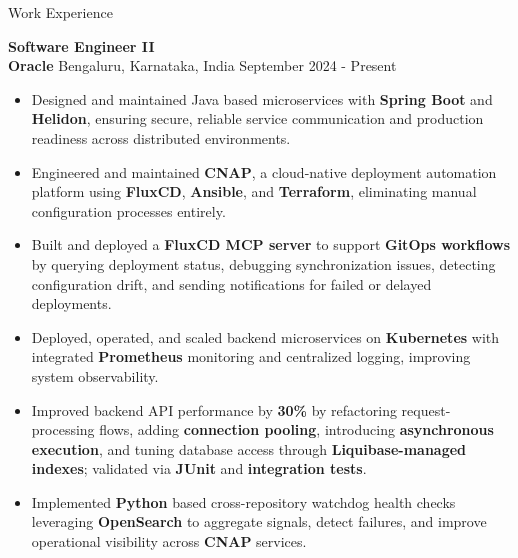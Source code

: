 \documentclass{resume}
\begin{document}
\begin{rSection}{Work Experience}

\textbf{Software Engineer II} \\
\textbf{Oracle} \textbar{} Bengaluru, Karnataka, India \hspace*{\fill} September 2024 - Present
\vspace{-2pt}
\begin{itemize}
    \item Designed and maintained Java based microservices with \textbf{Spring Boot} and \textbf{Helidon}, ensuring secure, reliable service communication and production readiness across distributed environments.
    \item Engineered and maintained \textbf{CNAP}, a cloud-native deployment automation platform using \textbf{FluxCD}, \textbf{Ansible}, and \textbf{Terraform}, eliminating manual configuration processes entirely.
    \item Built and deployed a \textbf{FluxCD MCP server} to support \textbf{GitOps workflows} by querying deployment status, debugging synchronization issues, detecting configuration drift, and sending notifications for failed or delayed deployments.
    \item Deployed, operated, and scaled backend microservices on \textbf{Kubernetes} with integrated \textbf{Prometheus} monitoring and centralized logging, improving system observability.
    \item Improved backend API performance by \textbf{30\%} by refactoring request-processing flows, adding \textbf{connection pooling}, introducing \textbf{asynchronous execution}, and tuning database access through \textbf{Liquibase-managed indexes}; validated via \textbf{JUnit} and \textbf{integration tests}.
    \item Implemented \textbf{Python} based cross-repository watchdog health checks leveraging \textbf{OpenSearch} to aggregate signals, detect failures, and improve operational visibility across \textbf{CNAP} services.
\end{itemize}


\end{rSection}
\end{document}
